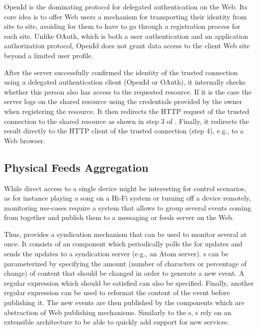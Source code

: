 OpenId is the dominating protocol for delegated authentication on the Web. Its core idea is to offer Web users a mechanism for transporting their identity from site to site, avoiding for them to have to go through a registration process for each site. Unlike OAuth, which is both a user authentication and an application authorization protocol, OpenId does not grant data access to the client Web site beyond a limited user profile.

After the \sac{} server successfully confirmed the identity of the trusted connection using a delegated authentication client (OpenId or OAuth), it internally checks whether this person also has access to the requested resource. If it is the case the \sac{} server logs on the shared resource using the credentials provided by the owner when registering the resource. It then redirects the HTTP request of the trusted connection to the shared resource as shown in step 3 of . Finally, it redirects the result  directly to the HTTP client of the trusted connection (step 4), e.g., to a Web browser. 


\subsection{Physical Feeds Aggregation}
While direct access to a single device might be interesting for control scenarios, as for instance playing a song on a Hi-Fi system or turning off a device remotely, monitoring use-cases require a system that allows to group several events coming from \sts{} together and publish them to a messaging or feeds server on the Web.

Thus, \sac{} provides a syndication mechanism that can be used to monitor several \sts{} at once. It consists of an  component which periodically polls the \sts{} for updates and sends the updates to a syndication server (e.g., an Atom server). s can be parameterized by specifying the amount (number of characters or percentage of change) of content that should be changed in order to generate a new event. A regular expression which should be satisfied can also be specified. Finally, another regular expression can be used to reformat the content of the event before publishing it. The new events are then published by the  components which are abstraction of Web publishing mechanisms. Similarly to the s, s rely on an extensible architecture to be able to quickly add support for new services.  

